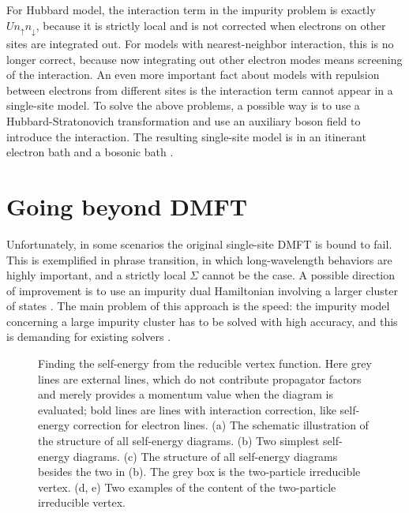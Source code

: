\documentclass[hyperref, a4paper]{article}
\begin{document}
For Hubbard model, the interaction term in the impurity problem is exactly $U n_{\uparrow} n_{\downarrow}$,
because it is strictly local and is not corrected 
when electrons on other sites are integrated out.
For models with nearest-neighbor interaction,
this is no longer correct,
because now integrating out other electron modes 
means screening of the interaction.
An even more important fact about models with repulsion between electrons from different sites 
is the interaction term cannot appear in a single-site model.
To solve the above problems, 
a possible way is to use a Hubbard-Stratonovich transformation 
and use an auxiliary boson field to introduce the interaction.
The resulting single-site model 
is in an itinerant electron bath 
and a bosonic bath \cite{sun_extended_2002}.



\section{Going beyond DMFT}\label{sec:more}

Unfortunately, in some scenarios the original single-site DMFT is bound to fail.
This is exemplified in phrase transition,
in which long-wavelength behaviors are highly important,
and a strictly local $\Sigma$ cannot be the case.
A possible direction of improvement is 
to use an impurity dual Hamiltonian involving a larger cluster of states 
\cite{kotliar_cellular_2001,park_cluster_2008}.
The main problem of this approach is the speed:
the impurity model concerning a large impurity cluster has to be solved with high accuracy,
and this is demanding for existing solvers 
\cite{potthoff_cluster_2018,gull_continuous-time_2011}.

\begin{figure}
    \centering
    
    \caption{
        Finding the self-energy from the reducible vertex function.
        Here grey lines are external lines, 
        which do not contribute propagator factors and merely provides a momentum value 
        when the diagram is evaluated;
        bold lines are lines with interaction correction,
        like self-energy correction for electron lines.
        (a) The schematic illustration of the structure of all self-energy diagrams.
        (b) Two simplest self-energy diagrams.
        (c) The structure of all self-energy diagrams besides the two in (b).
        The grey box is the two-particle irreducible vertex.
        (d, e) Two examples of the content of the two-particle irreducible vertex.
    }
    \label{fig:dga}
\end{figure}
\end{document}
